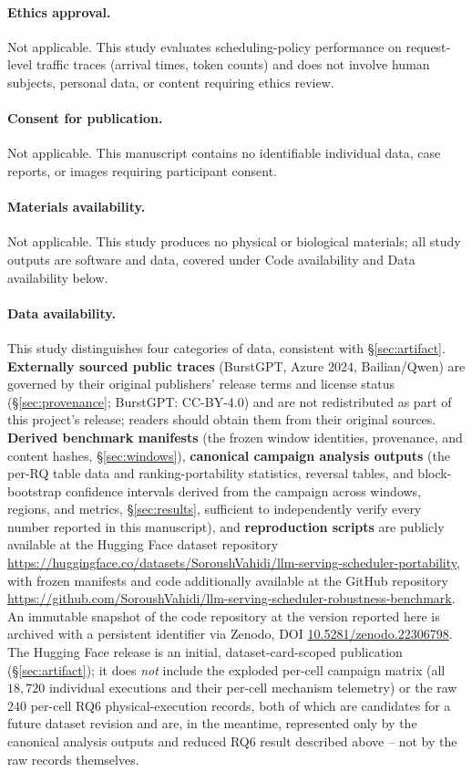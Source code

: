 \paragraph{Ethics approval.} Not applicable. This study evaluates
scheduling-policy performance on request-level traffic traces (arrival
times, token counts) and does not involve human subjects, personal data,
or content requiring ethics review.

\paragraph{Consent for publication.} Not applicable. This manuscript
contains no identifiable individual data, case reports, or images
requiring participant consent.

\paragraph{Materials availability.} Not applicable. This study produces
no physical or biological materials; all study outputs are software and
data, covered under Code availability and Data availability below.

\paragraph{Data availability.} This study distinguishes four categories of
data, consistent with \S\ref{sec:artifact}. \textbf{Externally sourced
public traces} (BurstGPT, Azure 2024, Bailian/Qwen) are governed by their
original publishers' release terms and license status
(\S\ref{sec:provenance}; BurstGPT: CC-BY-4.0) and are not redistributed as
part of this project's release; readers should obtain them from their
original sources. \textbf{Derived benchmark manifests} (the frozen window
identities, provenance, and content hashes, \S\ref{sec:windows}),
\textbf{canonical campaign analysis outputs} (the per-RQ table data and
ranking-portability statistics, reversal tables, and block-bootstrap
confidence intervals derived from the campaign across windows, regions,
and metrics, \S\ref{sec:results}, sufficient to independently verify every
number reported in this manuscript), and \textbf{reproduction scripts} are
publicly available at the Hugging Face dataset repository
\url{https://huggingface.co/datasets/SoroushVahidi/llm-serving-scheduler-portability},
with frozen manifests and code additionally available at the GitHub
repository
\url{https://github.com/SoroushVahidi/llm-serving-scheduler-robustness-benchmark}.
An immutable snapshot of the code repository at the version reported here
is archived with a persistent identifier via Zenodo, DOI
\href{https://doi.org/10.5281/zenodo.22306798}{10.5281/zenodo.22306798}.
The Hugging Face release is an initial, dataset-card-scoped publication
(\S\ref{sec:artifact}); it does \emph{not} include the exploded per-cell
campaign matrix (all $18{,}720$ individual executions and their per-cell
mechanism telemetry) or the raw $240$ per-cell RQ6 physical-execution
records, both of which are candidates for a future dataset revision and
are, in the meantime, represented only by the canonical analysis outputs
and reduced RQ6 result described above -- not by the raw records
themselves.

